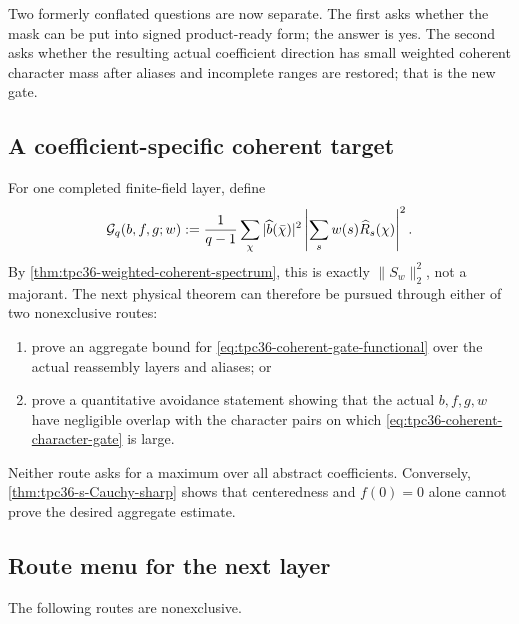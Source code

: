 Two formerly conflated questions are now separate.  The first asks whether
the mask can be put into signed product-ready form; the answer is yes.  The
second asks whether the resulting actual coefficient direction has small
weighted coherent character mass after aliases and incomplete ranges are
restored; that is the new gate.

\subsection{A coefficient-specific coherent target}

For one completed finite-field layer, define
\begin{equation}
 \mathcal G_q(b,f,g;w)
 :=\frac1{q-1}\sum_\chi
 |\widehat b(\bar\chi)|^2
 \left|\sum_sw(s)\widehat R_s(\chi)\right|^2.
 \label{eq:tpc36-coherent-gate-functional}
\end{equation}
By \cref{thm:tpc36-weighted-coherent-spectrum}, this is exactly
\(\|S_w\|_2^2\), not a majorant.  The next physical theorem can therefore
be pursued through either of two nonexclusive routes:
\begin{enumerate}[label=(\alph*)]
 \item prove an aggregate bound for
 \eqref{eq:tpc36-coherent-gate-functional} over the actual reassembly
 layers and aliases; or
 \item prove a quantitative avoidance statement showing that the actual
 \(b,f,g,w\) have negligible overlap with the character pairs on which
 \eqref{eq:tpc36-coherent-character-gate} is large.
\end{enumerate}
Neither route asks for a maximum over all abstract coefficients.
Conversely, \cref{thm:tpc36-s-Cauchy-sharp} shows that centeredness and
 \(f(0)=0\) alone cannot prove the desired aggregate estimate.

\subsection{Route menu for the next layer}

The following routes are nonexclusive.

